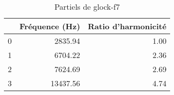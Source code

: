 \begin{table}
\centering
\caption{Partiels de glock-f7}
\label{table:partiels-glock-f7.wav}
\begin{tabular}{lrr}
\toprule
{} &  Fréquence (Hz) &  Ratio d'harmonicité \\
\midrule
0 &         2835.94 &                 1.00 \\
1 &         6704.22 &                 2.36 \\
2 &         7624.69 &                 2.69 \\
3 &        13437.56 &                 4.74 \\
\bottomrule
\end{tabular}
\end{table}
